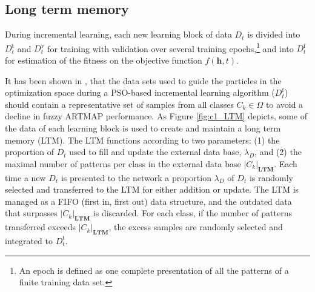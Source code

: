 \subsection{Long term memory}
\label{sec:c1_LTM}

During incremental learning, each new learning block of data $D_t$ is divided into $D_t^\text{t}$ and $D_t^\text{v}$ for training with validation over several training epochs,\footnote{An epoch is defined as one complete presentation of all the patterns of a finite training data set.} and into $D_t^\text{f}$ for estimation of the fitness on the objective function $f(\textbf{h},t)$.

\begin{figure*}[t]
  \centering
  \caption{Data management for the learning process using the long term memory. When a learning block $D_t$ is available, a proportion $\lambda_D$ of this data is assigned to the long term memory, and the rest is used for training, validation, and performance estimation. When the LTM is updated, old data is discarded, while excess data not used to fill and/or update the LTM (dues to size limitations) is integrated to the training data from $D_t$ to create the training data set $D_t^\text{t}$. Data contained in the LTM is then combined with data coming directly from $D_t$ dedicated to validation and fitness estimation. This combination is class-wise divided in two, to create the validation data set $D_t^\text{v}$ and the fitness estimation data set $D_t^\text{f}$}
 	\label{fig:c1_LTM}
\end{figure*}

It has been shown in \cite{connolly09}, that the data sets used to guide the particles in the optimization space during a PSO-based incremental learning algorithm ($D_t^\text{f}$) should contain a representative set of samples from all classes $C_k \in \Omega$ to avoid a decline in fuzzy ARTMAP performance. As Figure \ref{fig:c1_LTM} depicts, some of the data of each learning block is used to create and maintain a long term memory (LTM). The LTM functions according to two parameters: (1) the proportion of $D_t$ used to fill and update the external data base, $\lambda_D$, and (2) the maximal number of patterns per class in the external data base $|C_k|_\mathbf{LTM}$. Each time a new $D_t$ is presented to the network a proportion $\lambda_D$ of $D_t$ is randomly selected and transferred to the LTM for either addition or update. The LTM is managed as a FIFO (first in, first out) data structure, and the outdated data that surpasses $|C_k|_\mathbf{LTM}$ is discarded. For each class, if the number of patterns transferred exceeds $|C_k|_\mathbf{LTM}$, the excess samples are randomly selected and integrated to $D_t^\text{t}$.

